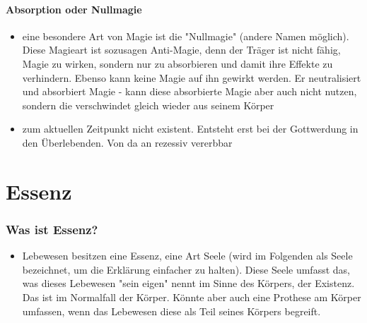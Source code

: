 \subsubsection{Absorption oder Nullmagie}\label{sec:nullmagie}
\begin{itemize}
	\item eine besondere Art von Magie ist die "Nullmagie" (andere Namen möglich). Diese Magieart ist sozusagen Anti-Magie, denn der Träger ist nicht fähig, Magie zu wirken, sondern nur zu absorbieren und damit ihre Effekte zu verhindern. Ebenso kann keine Magie auf ihn gewirkt werden. Er neutralisiert und absorbiert Magie - kann diese absorbierte Magie aber auch nicht nutzen, sondern die verschwindet gleich wieder aus seinem Körper
	\item zum aktuellen Zeitpunkt nicht existent. Entsteht erst bei der Gottwerdung in den Überlebenden. Von da an rezessiv vererbbar
\end{itemize}


\chapter{Essenz}
\subsection{Was ist Essenz?}
\begin{itemize}
	\item Lebewesen besitzen eine Essenz, eine Art Seele (wird im Folgenden als Seele bezeichnet, um die Erklärung einfacher zu halten). Diese Seele umfasst das, was dieses Lebewesen "sein eigen" nennt im Sinne des Körpers, der Existenz. Das ist im Normalfall der Körper. Könnte aber auch eine Prothese am Körper umfassen, wenn das Lebewesen diese als Teil seines Körpers begreift.
\end{itemize}